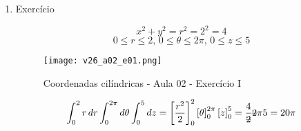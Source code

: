 \begin{enumerate}
	\item Exercício
		
	\begin{equation*}
		x^2 + y^2 = r^2 = 2^2 = 4
	\end{equation*}
	\begin{equation*}
		0 \leq r \leq 2,\, 0 \leq \theta \leq 2\pi,\, 0 \leq z \leq 5	
	\end{equation*}
	
	\begin{figure}[htb]
		\caption{Coordenadas cilíndricas - Aula 02 - Exercício I}
		\label{v26_a02_e01}
		\centering
		\texttt{[image: v26\_a02\_e01.png]}		
	\end{figure}
	
	\begin{gather*}
		\int_0^2 r\, dr \int_0^{2\pi} d\theta \int_0^5 dz = \left[\dfrac{r^2}{2}\right]_0^2 \left[\theta\right]_0^{2\pi} \left[z\right]_0^5 = \dfrac{4}{\overstrike{2}}\overstrike{2}\pi 5 = 20\pi 
	\end{gather*}
	
\end{enumerate}